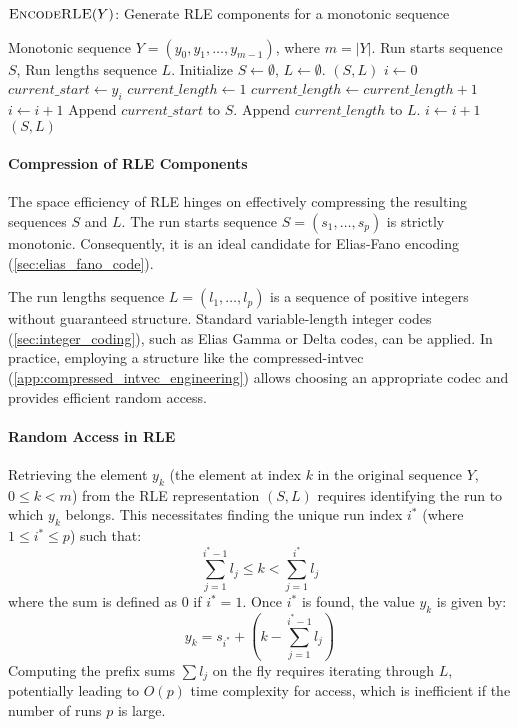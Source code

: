 \begin{algorithm}[htbp]
    \caption{$\textsc{EncodeRLE}(Y)$: Generate RLE components for a monotonic sequence}
    \label{alg:rle_encode} %
    \small
    \begin{algorithmic}[1]
        \Require Monotonic sequence $Y = (y_0, y_1, \dots, y_{m-1})$, where $m = |Y|$.
        \Ensure Run starts sequence $S$, Run lengths sequence $L$.
        \State Initialize $S \leftarrow \emptyset$, $L \leftarrow \emptyset$.
        \State \Return $(S, L)$
        \EndIf
        \State $i \leftarrow 0$
        \State $current\_start \leftarrow y_i$
        \State $current\_length \leftarrow 1$
        \State $current\_length \leftarrow current\_length + 1$
        \State $i \leftarrow i + 1$
        \EndWhile
        \State Append $current\_start$ to $S$.
        \State Append $current\_length$ to $L$.
        \State $i \leftarrow i + 1$
        \EndWhile
        \State \Return $(S, L)$
    \end{algorithmic}
\end{algorithm}

\paragraph{Compression of RLE Components}
The space efficiency of RLE hinges on effectively compressing the resulting sequences $S$ and $L$.
The run starts sequence $S = (s_1, \dots, s_p)$ is strictly monotonic. Consequently, it is an ideal candidate for Elias-Fano encoding (\autoref{sec:elias_fano_code}).

The run lengths sequence $L = (l_1, \dots, l_p)$ is a sequence of positive integers without guaranteed structure. Standard variable-length integer codes (\autoref{sec:integer_coding}), such as Elias Gamma or Delta codes, can be applied. In practice, employing a structure like the \textsf{compressed-intvec} (\autoref{app:compressed_intvec_engineering}) allows choosing an appropriate codec and provides efficient random access.

\paragraph{Random Access in RLE}
Retrieving the element $y_k$ (the element at index $k$ in the original sequence $Y$, $0 \le k < m$) from the RLE representation $(S, L)$ requires identifying the run to which $y_k$ belongs. This necessitates finding the unique run index $i^*$ (where $1 \le i^* \le p$) such that:
\[ \sum_{j=1}^{i^*-1} l_j \le k < \sum_{j=1}^{i^*} l_j \]
where the sum is defined as $0$ if $i^*=1$. Once $i^*$ is found, the value $y_k$ is given by:
\[ y_k = s_{i^*} + \left( k - \sum_{j=1}^{i^*-1} l_j \right) \]
Computing the prefix sums $\sum l_j$ on the fly requires iterating through $L$, potentially leading to $O(p)$ time complexity for access, which is inefficient if the number of runs $p$ is large.

